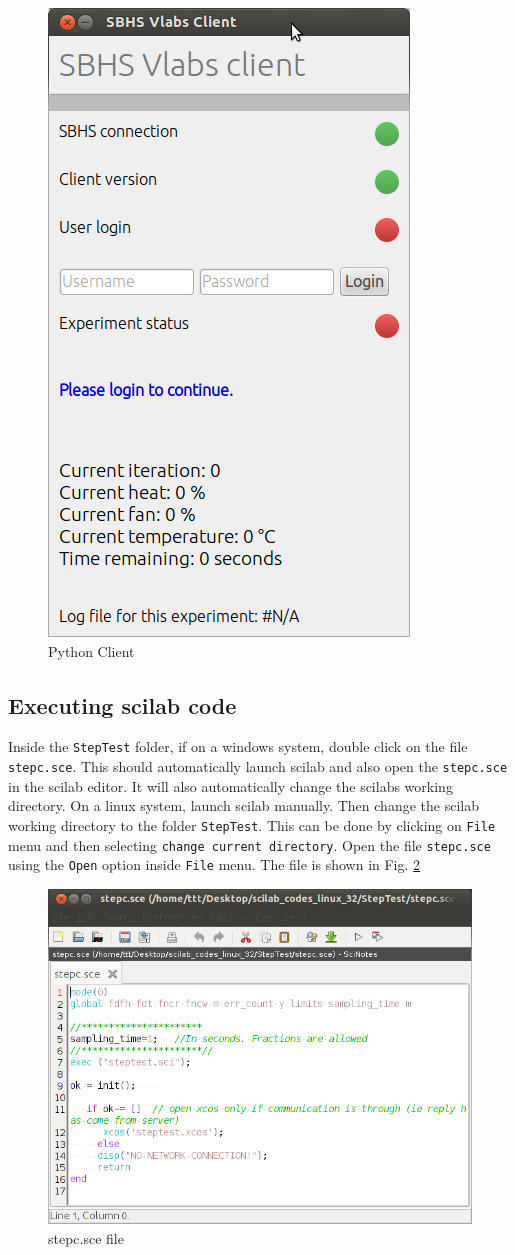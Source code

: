 \begin{figure}
\centering
\includegraphics[width=0.5\linewidth]{vlabs/python-client.png}
\caption{Python Client}
\label{python-client}
\end{figure}


\subsection{Executing scilab code}
Inside the {\tt StepTest} folder, if on a windows system, double click on the  file {\tt stepc.sce}. This should automatically launch scilab and also open the {\tt stepc.sce} in the scilab editor. It will also automatically change the scilabs working directory. On a linux system, launch scilab manually. Then change the scilab working directory to the folder {\tt StepTest}. This can be done by clicking on {\tt File} menu and then selecting {\tt change current directory}. Open the file {\tt stepc.sce} using the {\tt Open} option inside {\tt File} menu. The file is shown in Fig. \ref{stepc}

\begin{figure}
\centering
\includegraphics[width=0.7\linewidth]{vlabs/stepc.png}
\caption{stepc.sce file}
\label{stepc}
\end{figure}

